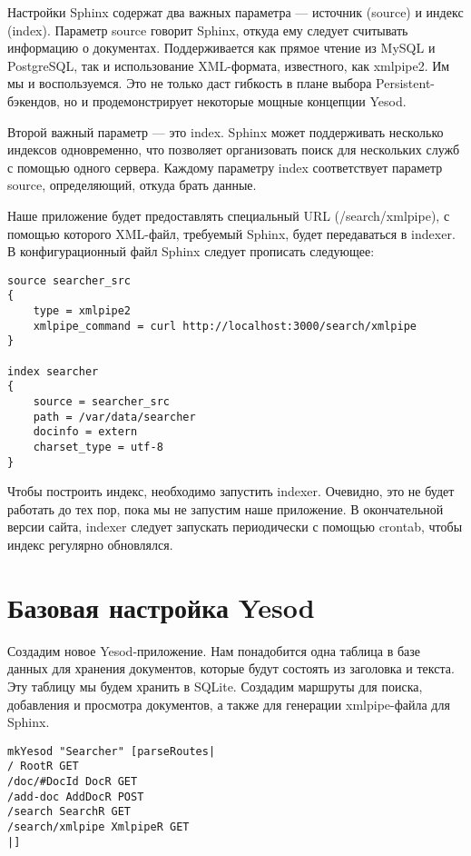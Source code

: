 Настройки Sphinx содержат два важных параметра --- источник (source) и индекс (index). Параметр source говорит Sphinx, откуда ему следует считывать информацию о документах. Поддерживается как прямое чтение из MySQL и PostgreSQL, так и использование XML-формата, известного, как xmlpipe2. Им мы и воспользуемся. Это не только даст гибкость в плане выбора Persistent-бэкендов, но и продемонстрирует некоторые мощные концепции Yesod.

Второй важный параметр --- это index. Sphinx может поддерживать несколько индексов одновременно, что позволяет организовать поиск для нескольких служб с помощью одного сервера. Каждому параметру index соответствует параметр source, определяющий, откуда брать данные.

Наше приложение будет предоставлять специальный URL (/search/xmlpipe), с помощью которого XML-файл, требуемый Sphinx, будет передаваться в indexer. В конфигурационный файл Sphinx следует прописать следующее:

\begin{lstlisting}
source searcher_src
{
    type = xmlpipe2
    xmlpipe_command = curl http://localhost:3000/search/xmlpipe
}

index searcher
{
    source = searcher_src
    path = /var/data/searcher
    docinfo = extern
    charset_type = utf-8
}
\end{lstlisting}

Чтобы построить индекс, необходимо запустить indexer. Очевидно, это не будет работать до тех пор, пока мы не запустим наше приложение.  В окончательной версии сайта, indexer следует запускать периодически с помощью crontab, чтобы индекс регулярно обновлялся.

\section{Базовая настройка Yesod} %

Создадим новое Yesod-приложение. Нам понадобится одна таблица в базе данных для хранения документов, которые будут состоять из заголовка и текста. Эту таблицу мы будем хранить в SQLite. Создадим маршруты для поиска, добавления и просмотра документов, а также для генерации xmlpipe-файла для Sphinx.

\begin{lstlisting}
mkYesod "Searcher" [parseRoutes|
/ RootR GET
/doc/#DocId DocR GET
/add-doc AddDocR POST
/search SearchR GET
/search/xmlpipe XmlpipeR GET
|]
\end{lstlisting}

